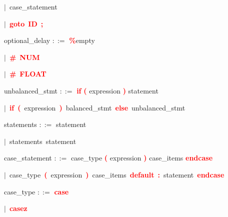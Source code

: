 \mbox{$|$ case\_statement}

\mbox{$|$ \textbf{\textcolor{red}{goto}} \textbf{\textcolor{red}{ID}} \textbf{\textcolor{red}{;}}}

\vspace{1em}
\noindent
\settowidth{\parindent}{\hspace{4ex}}
optional\_delay $::=$\hspace{1ex} \textbf{\textcolor{red}{\%}}empty

\mbox{$|$ \textbf{\textcolor{red}{\textbf{\textcolor{red}{\#}}}} \textbf{\textcolor{red}{NUM}}}

\mbox{$|$ \textbf{\textcolor{red}{\textbf{\textcolor{red}{\#}}}} \textbf{\textcolor{red}{FLOAT}}}

\vspace{1em}
\noindent
\settowidth{\parindent}{\hspace{4ex}}
unbalanced\_stmt $::=$\hspace{1ex} \textbf{\textcolor{red}{if}} \textbf{\textcolor{red}{(}} expression \textbf{\textcolor{red}{)}} statement

\mbox{$|$ \textbf{\textcolor{red}{if}} \textbf{\textcolor{red}{(}} expression \textbf{\textcolor{red}{)}} balanced\_stmt \textbf{\textcolor{red}{else}} unbalanced\_stmt}

\vspace{1em}
\noindent
\settowidth{\parindent}{\hspace{4ex}}
statements $::=$\hspace{1ex} statement

\mbox{$|$ statements statement}

\vspace{1em}
\noindent
\settowidth{\parindent}{\hspace{4ex}}
case\_statement $::=$\hspace{1ex} case\_type \textbf{\textcolor{red}{(}} expression \textbf{\textcolor{red}{)}} case\_items \textbf{\textcolor{red}{endcase}}

\mbox{$|$ case\_type \textbf{\textcolor{red}{(}} expression \textbf{\textcolor{red}{)}} case\_items \textbf{\textcolor{red}{default}} \textbf{\textcolor{red}{:}} statement \textbf{\textcolor{red}{endcase}}}

\vspace{1em}
\noindent
\settowidth{\parindent}{\hspace{4ex}}
case\_type $::=$\hspace{1ex} \textbf{\textcolor{red}{case}}

\mbox{$|$ \textbf{\textcolor{red}{casez}}}

